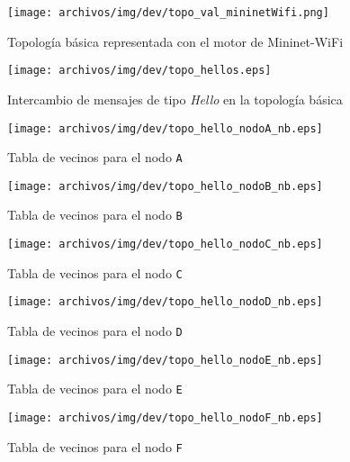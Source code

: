 \begin{figure}[ht]
    \centering
    \texttt{[image: archivos/img/dev/topo\_val\_mininetWifi.png]}
    \caption{Topología básica representada con el motor de Mininet-WiFi}
    \label{fig:topo_val_mininetWifi}
\end{figure}

\begin{figure}[ht]
    \centering
    \texttt{[image: archivos/img/dev/topo\_hellos.eps]}
    \caption{Intercambio de mensajes de tipo \textit{Hello} en la topología básica}
    \label{fig:topo_hellos}
\end{figure}


\begin{figure}[ht!]
    \centering
    \texttt{[image: archivos/img/dev/topo\_hello\_nodoA\_nb.eps]}
    \caption{Tabla de vecinos para el nodo \texttt{A}}
    \label{fig:topo_hello_nodoA_nb}
\end{figure}

\begin{figure}[ht!]
    \centering
    \texttt{[image: archivos/img/dev/topo\_hello\_nodoB\_nb.eps]}
    \caption{Tabla de vecinos para el nodo \texttt{B}}
    \label{fig:topo_hello_nodoB_nb}
\end{figure}

\begin{figure}[ht!]
    \centering
    \texttt{[image: archivos/img/dev/topo\_hello\_nodoC\_nb.eps]}
    \caption{Tabla de vecinos para el nodo \texttt{C}}
    \label{fig:topo_hello_nodoC_nb}
\end{figure}


\begin{figure}[ht!]
    \centering
    \texttt{[image: archivos/img/dev/topo\_hello\_nodoD\_nb.eps]}
    \caption{Tabla de vecinos para el nodo \texttt{D}}
    \label{fig:topo_hello_nodoD_nb}
\end{figure}


\begin{figure}[ht!]
    \centering
    \texttt{[image: archivos/img/dev/topo\_hello\_nodoE\_nb.eps]}
    \caption{Tabla de vecinos para el nodo \texttt{E}}
    \label{fig:topo_hello_nodoE_nb}
\end{figure}


\begin{figure}[ht!]
    \centering
    \texttt{[image: archivos/img/dev/topo\_hello\_nodoF\_nb.eps]}
    \caption{Tabla de vecinos para el nodo \texttt{F}}
    \label{fig:topo_hello_nodoF_nb}
\end{figure}


